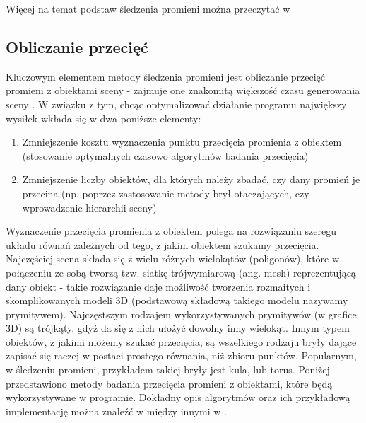 \noindent
Więcej na temat podstaw śledzenia promieni można przeczytać w \cite{foley95, suffern2007, scratch}

\subsection{Obliczanie przecięć}

Kluczowym elementem metody śledzenia promieni jest obliczanie przecięć promieni z obiektami sceny - zajmuje one znakomitą większość czasu generowania sceny \cite{suffern2007}. W związku z tym, chcąc optymalizować działanie programu największy wysiłek wkłada się w dwa poniższe elementy:

\begin{enumerate}

\item Zmniejszenie kosztu wyznaczenia punktu przecięcia promienia z obiektem (stosowanie optymalnych czasowo algorytmów badania przecięcia)

\item Zmniejszenie liczby obiektów, dla których należy zbadać, czy dany promień je przecina (np. poprzez zastosowanie metody brył otaczających, czy wprowadzenie hierarchii sceny)

\end{enumerate}

Wyznaczenie przecięcia promienia z obiektem polega na rozwiązaniu szeregu układu równań zależnych od tego, z jakim obiektem szukamy przecięcia. Najczęściej scena składa się z wielu różnych wielokątów (poligonów), które w połączeniu ze sobą tworzą tzw. siatkę trójwymiarową (ang. mesh) reprezentującą dany obiekt - takie rozwiązanie daje możliwość tworzenia rozmaitych i skomplikowanych modeli 3D (podstawową składową takiego modelu nazywamy prymitywem). Najczęstszym rodzajem wykorzystywanych prymitywów (w grafice 3D) są trójkąty, gdyż da się z nich ułożyć dowolny inny wielokąt. Innym typem obiektów, z jakimi możemy szukać przecięcia, są wszelkiego rodzaju bryły dające zapisać się raczej w postaci prostego równania, niż zbioru punktów. Popularnym, w śledzeniu promieni, przykładem takiej bryły jest kula, lub torus. Poniżej przedstawiono metody badania przecięcia promieni z obiektami, które będą wykorzystywane w programie. Dokładny opis algorytmów oraz ich przykładową implementację można znaleźć w między innymi w \cite{dunn02, scratch}.

